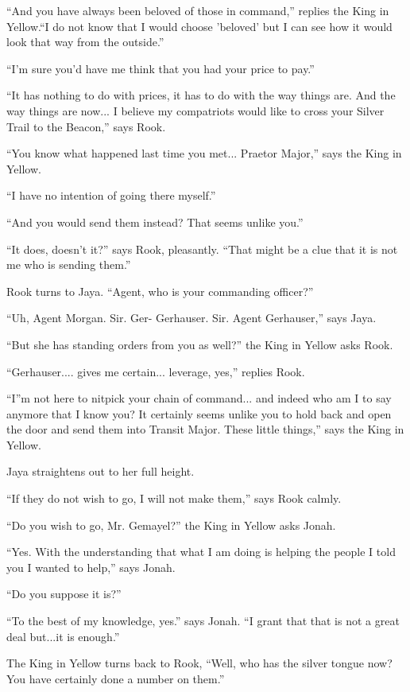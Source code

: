 ``And you have always been beloved of those in command,'' replies the King in Yellow.``I do not know that I would choose 'beloved' but I can see how it would look that way from the outside.''

``I'm sure you'd have me think that you had your price to pay.''

``It has nothing to do with prices, it has to do with the way things are.  And the way things are now... I believe my compatriots would like to cross your Silver Trail to the Beacon,'' says Rook.

``You know what happened last time you met... Praetor Major,'' says the King in Yellow.

``I have no intention of going there myself.''

``And you would send them instead?  That seems unlike you.''

``It does, doesn't it?'' says Rook, pleasantly.  ``That might be a clue that it is not me who is sending them.''

Rook turns to Jaya.  ``Agent, who is your commanding officer?''

``Uh, Agent Morgan.  Sir.  Ger- Gerhauser. Sir.  Agent Gerhauser,'' says Jaya.

``But she has standing orders from you as well?'' the King in Yellow asks Rook.

``Gerhauser.... gives me certain...  leverage, yes,'' replies Rook.

``I''m not here to nitpick your chain of command... and indeed who am I to say anymore that I know you?  It certainly seems unlike you to hold back and open the door and send them into Transit Major.  These little things,'' says the King in Yellow.

Jaya straightens out to her full height.

``If they do not wish to go, I will not make them,'' says Rook calmly.



``Do you wish to go, Mr. Gemayel?'' the King in Yellow asks Jonah.

``Yes. With the understanding that what I am doing is helping the people I told you I wanted to help,'' says Jonah.

``Do you suppose it is?'' 

``To the best of my knowledge, yes.'' says Jonah.  ``I grant that that is not a great deal but...it is enough.''

The King in Yellow turns back to Rook, ``Well, who has the silver tongue now?  You have certainly done a number on them.''

